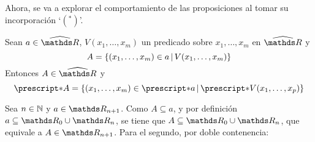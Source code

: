Ahora, se va a explorar el comportamiento de las proposiciones al
tomar su incorporación `$({^*})$'.

\begin{theorem}\label{theo:FT}
  Sean $a\in\Rh$, $V(x_1,\dots,x_m)$ un predicado sobre $x_1,\dots,x_m$
  en $\Rh$ y
  \[A=\left\{(x_1,\dots,x_m)\in a\,\middle|\,V(x_1,\dots,x_m)\right\}\]
  Entonces $A\in\Rh$ y 
  \[\st{A}=\set{(x_1,\dots,x_m)\in\st{a}}{\st{V(x_1,\dots,x_p)}}\]
\end{theorem}
\begin{demo}
  Sea $n\in\mathbb{N}$ y $a\in\R_{n+1}$. Como $A\subseteq a$, y por definición
  $a\subseteq \R_0\cup\R_n$, se tiene que $A\subseteq\R_0\cup\R_n$, que
  equivale a $A\in\R_{n+1}$. Para el segundo, por doble contenencia:
  \begin{longderivation}
      \\
    \equiv\\
      \\
    \equiv\\
      \\
    \\
      \\
    \equiv\\
      \\
    \equiv\\
  \end{longderivation}


\end{demo}
